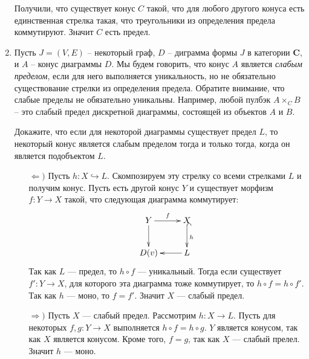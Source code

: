 \documentclass[draft]{article}
\newcommand{\cat}[1]{\mathbf{#1}}
\renewcommand{\C}{\cat{C}}
\begin{document}
\begin{enumerate}
Получили, что существует конус $C$ такой, что для любого другого конуса есть единственная стрелка такая, что треугольники из определения предела коммутируют. Значит $C$ есть предел.

\item Пусть $J = (V,E)$ -- некоторый граф, $D$ -- диграмма формы $J$ в категории $\C$, и $A$ -- конус диаграммы $D$.
Мы будем говорить, что конус $A$ является \emph{слабым пределом}, если для него выполняется уникальность, но не обязательно существование стрелки из определения предела.
Обратите внимание, что слабые пределы не обязательно уникальны.
Например, любой пулбэк $A \times_C B$ -- это слабый предел дискретной диаграммы, состоящей из объектов $A$ и $B$.

Докажите, что если для некоторой диаграммы существует предел $L$, то некоторый конус является слабым пределом тогда и только тогда, когда он является подобъектом $L$.

\begin{itemize}
\item[$\Leftarrow)$] Пусть $h: X \hookrightarrow L$. Скомпозируем эту стрелку со всеми стрелками $L$ и получим конус. Пусть есть другой конус $Y$ и существует морфизм $f: Y \to X$ такой, что следующая диаграмма коммутирует:
\[ \xymatrix{ 
Y \ar[r]^f \ar[d] & X \ar@{^{(}->}[d]^h \\
D(v)& L \ar[l]
} \]
Так как $L$ --- предел, то $h\circ f$ --- уникальный. Тогда если существует $f' : Y \to X$, для которого эта диаграмма тоже коммутирует, то  $h\circ f = h \circ f'$. Так как $h$ --- моно, то $f=f'$. Значит $X$ --- слабый предел.

\item[$\Rightarrow)$] Пусть $X$ --- слабый предел. Рассмотрим $h: X \to L$. Пусть для некоторых $f, g : Y \to X$ выполняется $h \circ f = h \circ g$. $Y$ является конусом, так как $X$ является конусом. Кроме того, $f = g$, так как $X$ --- слабый прелел. Значит $h$ --- моно.

\end{itemize}

\end{enumerate}
\end{document}
